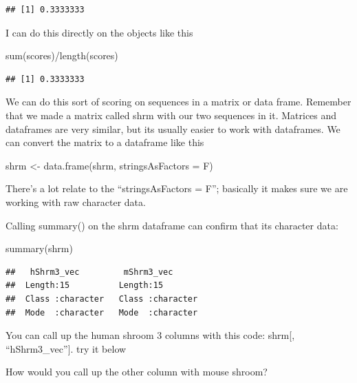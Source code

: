 \documentclass[
]{book}
\newenvironment{Shaded}{\begin{snugshade}}{\end{snugshade}}
\newcommand{\AttributeTok}[1]{\textcolor[rgb]{0.77,0.63,0.00}{#1}}
\newcommand{\FunctionTok}[1]{\textcolor[rgb]{0.00,0.00,0.00}{#1}}
\newcommand{\NormalTok}[1]{#1}
\newcommand{\OtherTok}[1]{\textcolor[rgb]{0.56,0.35,0.01}{#1}}
\newcommand{\SpecialCharTok}[1]{\textcolor[rgb]{0.00,0.00,0.00}{#1}}
\begin{document}
\begin{verbatim}
## [1] 0.3333333
\end{verbatim}

I can do this directly on the objects like this

\begin{Shaded}
\begin{Highlighting}[]
\FunctionTok{sum}\NormalTok{(scores)}\SpecialCharTok{/}\FunctionTok{length}\NormalTok{(scores)}
\end{Highlighting}
\end{Shaded}

\begin{verbatim}
## [1] 0.3333333
\end{verbatim}

We can do this sort of scoring on sequences in a matrix or data frame. Remember that we made a matrix called shrm with our two sequences in it. Matrices and dataframes are very similar, but its usually easier to work with dataframes. We can convert the matrix to a dataframe like this

\begin{Shaded}
\begin{Highlighting}[]
\NormalTok{shrm }\OtherTok{\textless{}{-}} \FunctionTok{data.frame}\NormalTok{(shrm, }\AttributeTok{stringsAsFactors =}\NormalTok{ F)}
\end{Highlighting}
\end{Shaded}

There's a lot relate to the ``stringsAsFactors = F''; basically it makes sure we are working with raw character data.

Calling summary() on the shrm dataframe can confirm that its character data:

\begin{Shaded}
\begin{Highlighting}[]
\FunctionTok{summary}\NormalTok{(shrm)}
\end{Highlighting}
\end{Shaded}

\begin{verbatim}
##   hShrm3_vec         mShrm3_vec       
##  Length:15          Length:15         
##  Class :character   Class :character  
##  Mode  :character   Mode  :character
\end{verbatim}

You can call up the human shroom 3 columns with this code: shrm{[}, ``hShrm3\_vec''{]}. try it below

How would you call up the other column with mouse shroom?
\end{document}
